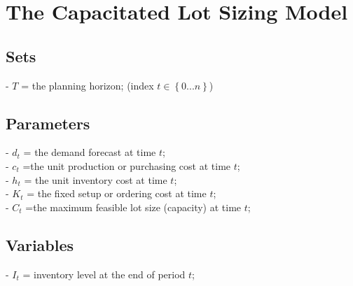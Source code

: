 \documentclass[a4paper,12pt,titlepage]{article}
\begin{document}
\section*{The Capacitated Lot Sizing Model}
\subsection*{Sets}
- $T$ = the planning horizon; (index $t\in \left\lbrace 0...n\right\rbrace $)
\subsection*{Parameters}
- $d_t$ = the demand forecast at time $t$;\\

- $c_t$ =the unit production or purchasing cost at time $t$;\\

- $h_t$ = the unit inventory cost at time $t$;\\

- $K_t$ = the fixed setup or ordering cost at time $t$;\\

- $C_t$ =the maximum feasible lot size (capacity) at time $t$;\\
\subsection*{Variables}
- $I_t$ = inventory level at the end of period $t$;\\
\end{document}
